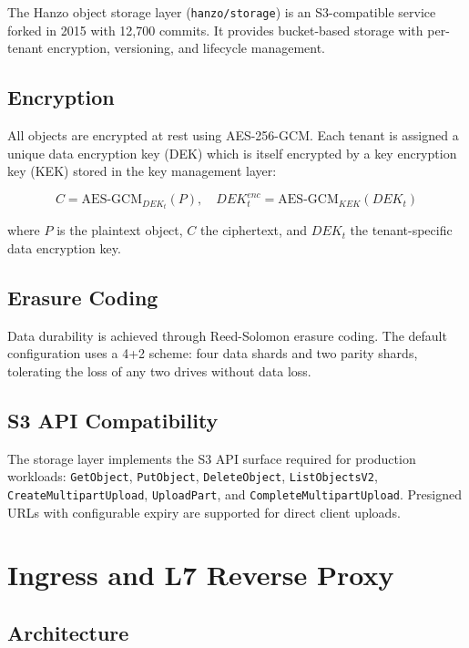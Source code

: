 \documentclass[11pt,a4paper]{article}
\begin{document}
The Hanzo object storage layer (\texttt{hanzo/storage}) is an S3-compatible service forked in 2015 with 12{,}700 commits. It provides bucket-based storage with per-tenant encryption, versioning, and lifecycle management.

\subsection{Encryption}

All objects are encrypted at rest using AES-256-GCM. Each tenant is assigned a unique data encryption key (DEK) which is itself encrypted by a key encryption key (KEK) stored in the key management layer:

\begin{equation}
    C = \mathrm{AES\text{-}GCM}_{DEK_t}(P), \quad DEK_t^{enc} = \mathrm{AES\text{-}GCM}_{KEK}(DEK_t)
\end{equation}

where $P$ is the plaintext object, $C$ the ciphertext, and $DEK_t$ the tenant-specific data encryption key.

\subsection{Erasure Coding}

Data durability is achieved through Reed-Solomon erasure coding. The default configuration uses a 4+2 scheme: four data shards and two parity shards, tolerating the loss of any two drives without data loss.

\subsection{S3 API Compatibility}

The storage layer implements the S3 API surface required for production workloads: \texttt{GetObject}, \texttt{PutObject}, \texttt{DeleteObject}, \texttt{ListObjectsV2}, \texttt{CreateMultipartUpload}, \texttt{UploadPart}, and \texttt{CompleteMultipartUpload}. Presigned URLs with configurable expiry are supported for direct client uploads.

\section{Ingress and L7 Reverse Proxy}

\subsection{Architecture}
\end{document}
